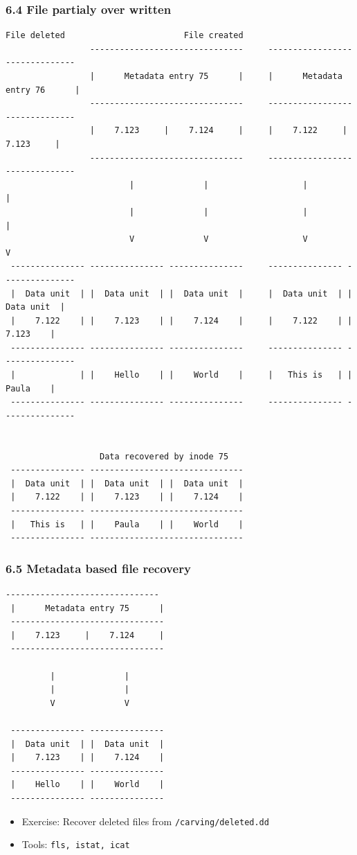 \begin{frame}[fragile]
  \frametitle{6.4 File partialy over written}
  \begin{lstlisting}[basicstyle=\tiny\ttfamily]
                          File deleted                        File created
                 -------------------------------     -------------------------------
                 |      Metadata entry 75      |     |      Metadata entry 76      |
                 -------------------------------     -------------------------------
                 |    7.123     |    7.124     |     |    7.122     |    7.123     |
                 -------------------------------     -------------------------------
                         |              |                   |              |
                         |              |                   |              |
                         V              V                   V              V
 --------------- --------------- ---------------     --------------- ---------------
 |  Data unit  | |  Data unit  | |  Data unit  |     |  Data unit  | |  Data unit  |
 |    7.122    | |    7.123    | |    7.124    |     |    7.122    | |    7.123    |
 --------------- --------------- ---------------     --------------- ---------------
 |             | |    Hello    | |    World    |     |   This is   | |    Paula    |
 --------------- --------------- ---------------     --------------- ---------------


                   Data recovered by inode 75  
 --------------- -------------------------------
 |  Data unit  | |  Data unit  | |  Data unit  |
 |    7.122    | |    7.123    | |    7.124    |
 --------------- -------------------------------
 |   This is   | |    Paula    | |    World    |
 --------------- -------------------------------
  \end{lstlisting}
\end{frame}


\begin{frame}[fragile]
  \frametitle{6.5 Metadata based file recovery}
  \begin{lstlisting}[basicstyle=\tiny\ttfamily]
 -------------------------------
 |      Metadata entry 75      |
 -------------------------------
 |    7.123     |    7.124     |
 -------------------------------

         |              |
         |              |
         V              V

 --------------- ---------------
 |  Data unit  | |  Data unit  |
 |    7.123    | |    7.124    |
 --------------- ---------------
 |    Hello    | |    World    |
 --------------- ---------------
  \end{lstlisting}
    \begin{itemize}
        \item[] Exercise: Recover deleted files from \texttt{/carving/deleted.dd}
	\item[] Tools: \texttt{fls, istat, icat}
    \end{itemize}
\end{frame}


